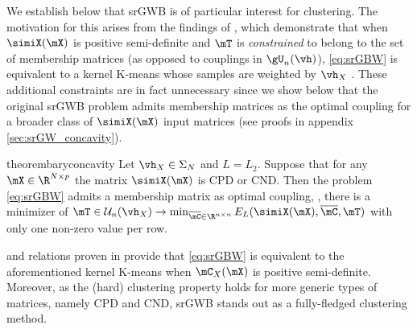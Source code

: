 We establish below that srGWB is of particular interest for clustering. The motivation for this arises from the findings of \citet{chen2023gromov}, which demonstrate that when $\simiX(\mX)$ is positive semi-definite and $\mT$ is \emph{constrained} to belong to the set of membership matrices (as opposed to couplings in $\gU_n(\vh)$), \cref{eq:srGBW} is equivalent to a kernel K-means whose samples are weighted by $\vh_X$ \citep{dhillon2004kernel, dhillon2007weighted}. These additional constraints are in fact unnecessary since we show below that the original srGWB problem admits membership matrices as the optimal coupling for a broader class of $\simiX(\mX)$ input matrices (see proofs in appendix \ref{sec:srGW_concavity}).%
\begin{restatable}{theorem}{baryconcavity}
	\label{theo:srgw_bary_concavity}
	Let $\vh_X \in \Sigma_N$ and $L=L_2$. Suppose that for any $\mX \in \R^{N \times p}$ the matrix $\simiX(\mX)$ is CPD or CND. Then the problem \cref{eq:srGBW} admits a membership matrix as optimal coupling, \ie, there is a minimizer of $\mT \in \mathcal{U}_n(\vh_X) \to \min_{\overline{\mC} \in \R^{n \times n}}  E_L(\simiX(\mX), \overline{\mC}, \mT)$ with only one non-zero value per row.
\end{restatable}
 and relations proven in \citet{chen2023gromov} provide that  \cref{eq:srGBW} is equivalent to the aforementioned kernel K-means when $\mC_X(\mX)$ is positive semi-definite. Moreover, as the (hard) clustering property holds for more generic types of matrices, namely CPD and CND, srGWB stands out as a fully-fledged clustering method.
